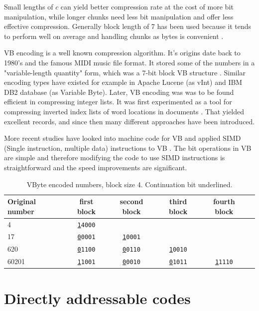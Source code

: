 Small lengths of $c$ can yield better compression rate at the cost of more bit manipulation, while longer chunks need less bit manipulation and 
offer less effective compression. Generally block length of 7 has been used because it tends to perform well on average and handling chunks as bytes is 
convenient \citep{Man08}.

VB encoding is a well known compression algorithm. It's origins date back to 1980's and the famous MIDI music file format. It stored some of the numbers
in a "variable-length quantity" form, which was a 7-bit block VB structure \citep{Mid96}. Similar encoding types have existed for example in Apache Lucene 
(as vInt) and IBM DB2 database (as Variable Byte). Later, VB encoding was was to be found efficient in compressing integer lists. It was first experimented 
as a tool for compressing inverted index lists of word locations in documents \citep{Sch02}. That yielded excellent records, and since then many different 
approaches have been introduced. 

More recent studies have looked into machine code for VB and applied SIMD (Single instruction, multiple data) instructions to VB \citep{Lem18,Pla15}. The bit 
operations in VB are simple and therefore modifying the code to use SIMD instructions is straightforward and the speed improvements are significant. 

\begin{table}
\centering
\begin{tabular}{l||c c c c c} 
Original number & first block & second block & third block & fourth block &\\ 
\hline \hline 
4  & \texttt{\underline{1}4000}    &                             &                           &  &  \\
17  & \texttt{\underline{0}0001}   & \texttt{\underline{1}0001}  &                           &  &  \\
620  & \texttt{\underline{0}1100}  & \texttt{\underline{0}0110} & \texttt{\underline{1}0010} &  &  \\
60201 & \texttt{\underline{1}1001} & \texttt{\underline{0}0010} & \texttt{\underline{0}1011} & \texttt{\underline{1}1110} &  \\

\hline
\end{tabular}
\caption{VByte encoded numbers, block size 4. Continuation bit underlined.\label{table:vbytes}}
\end{table}


\chapter{Directly addressable codes} \label{chapter:DAC}

